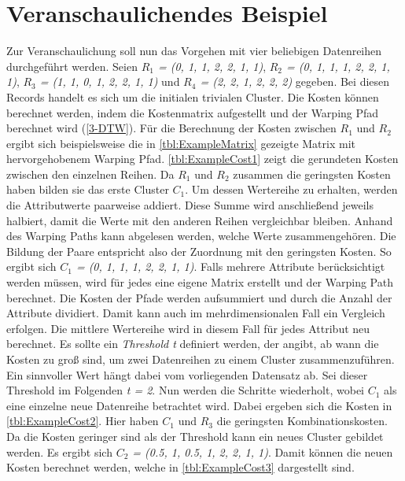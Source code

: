 \section{Veranschaulichendes Beispiel}
\label{3-Example}
Zur Veranschaulichung soll nun das Vorgehen mit vier beliebigen Datenreihen durchgeführt werden.
Seien \emph{$R_{1}$ = (0, 1, 1, 2, 2, 1, 1)}, \emph{$R_{2}$ = (0, 1, 1, 1, 2, 2, 1, 1)},
\emph{$R_{3}$ = (1, 1, 0, 1, 2, 2, 1, 1)} und \emph{$R_{4}$ = (2, 2, 1, 2, 2, 2)} gegeben.
Bei diesen Records handelt es sich um die initialen trivialen Cluster.
Die Kosten können berechnet werden, indem die Kostenmatrix aufgestellt und der Warping Pfad berechnet wird (\autoref{3-DTW}).
Für die Berechnung der Kosten zwischen \emph{$R_{1}$} und \emph{$R_{2}$} ergibt sich beispielsweise
die in \autoref{tbl:ExampleMatrix} gezeigte Matrix
mit hervorgehobenem Warping Pfad.
\autoref{tbl:ExampleCost1} zeigt die gerundeten Kosten zwischen den einzelnen Reihen.
Da \emph{$R_{1}$} und \emph{$R_{2}$} zusammen die geringsten Kosten haben bilden sie das erste Cluster \emph{$C_{1}$}.
Um dessen Wertereihe zu erhalten, werden die Attributwerte paarweise addiert.
Diese Summe wird anschließend jeweils halbiert, damit die Werte mit den anderen Reihen vergleichbar bleiben.
Anhand des Warping Paths kann abgelesen werden, welche Werte zusammengehören.
Die Bildung der Paare entspricht also der Zuordnung mit den geringsten Kosten.
So ergibt sich \emph{$C_{1}$ = (0, 1, 1, 1, 2, 2, 1, 1)}.
Falls mehrere Attribute berücksichtigt werden müssen,
wird für jedes eine eigene Matrix erstellt und der Warping Path berechnet.
Die Kosten der Pfade werden aufsummiert und durch die Anzahl der Attribute dividiert.
Damit kann auch im mehrdimensionalen Fall ein Vergleich erfolgen.
Die mittlere Wertereihe wird in diesem Fall für jedes Attribut neu berechnet.
Es sollte ein \emph{Threshold t} definiert werden,
der angibt, ab wann die Kosten zu groß sind, um zwei Datenreihen zu einem Cluster zusammenzuführen.
Ein sinnvoller Wert hängt dabei vom vorliegenden Datensatz ab.
Sei dieser Threshold im Folgenden \emph{t = 2}.
Nun werden die Schritte wiederholt, wobei \emph{$C_{1}$} als eine einzelne neue Datenreihe betrachtet wird.
Dabei ergeben sich die Kosten in \autoref{tbl:ExampleCost2}.
Hier haben \emph{$C_{1}$} und \emph{$R_{3}$} die geringsten Kombinationskosten.
Da die Kosten geringer sind als der Threshold kann ein neues Cluster gebildet werden.
Es ergibt sich \emph{$C_{2}$ = (0.5, 1, 0.5, 1, 2, 2, 1, 1)}.
Damit können die neuen Kosten berechnet werden,
welche in \autoref{tbl:ExampleCost3} dargestellt sind.
